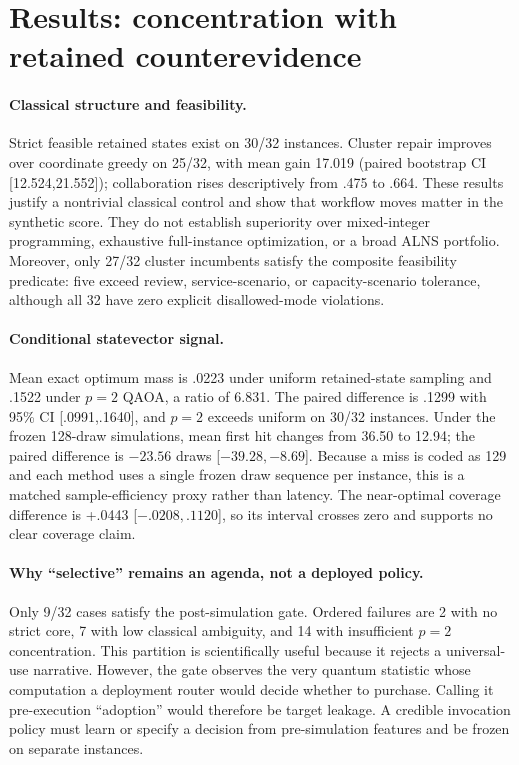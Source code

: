 \section{Results: concentration with retained counterevidence}
\label{sec:results}

\paragraph{Classical structure and feasibility.}
Strict feasible retained states exist on 30/32 instances. Cluster repair improves over coordinate greedy on 25/32, with mean gain 17.019 (paired bootstrap CI [12.524,21.552]); collaboration rises descriptively from .475 to .664. These results justify a nontrivial classical control and show that workflow moves matter in the synthetic score. They do not establish superiority over mixed-integer programming, exhaustive full-instance optimization, or a broad ALNS portfolio. Moreover, only 27/32 cluster incumbents satisfy the composite feasibility predicate: five exceed review, service-scenario, or capacity-scenario tolerance, although all 32 have zero explicit disallowed-mode violations.

\paragraph{Conditional statevector signal.}
Mean exact optimum mass is .0223 under uniform retained-state sampling and .1522 under $p=2$ QAOA, a ratio of 6.831. The paired difference is .1299 with 95\% CI [.0991,.1640], and $p=2$ exceeds uniform on 30/32 instances. Under the frozen 128-draw simulations, mean first hit changes from 36.50 to 12.94; the paired difference is $-23.56$ draws [${-39.28},{-8.69}$]. Because a miss is coded as 129 and each method uses a single frozen draw sequence per instance, this is a matched sample-efficiency proxy rather than latency. The near-optimal coverage difference is +.0443 [${-.0208},.1120$], so its interval crosses zero and supports no clear coverage claim.



\paragraph{Why ``selective'' remains an agenda, not a deployed policy.}
Only 9/32 cases satisfy the post-simulation gate. Ordered failures are 2 with no strict core, 7 with low classical ambiguity, and 14 with insufficient $p=2$ concentration. This partition is scientifically useful because it rejects a universal-use narrative. However, the gate observes the very quantum statistic whose computation a deployment router would decide whether to purchase. Calling it pre-execution ``adoption'' would therefore be target leakage. A credible invocation policy must learn or specify a decision from pre-simulation features and be frozen on separate instances.

